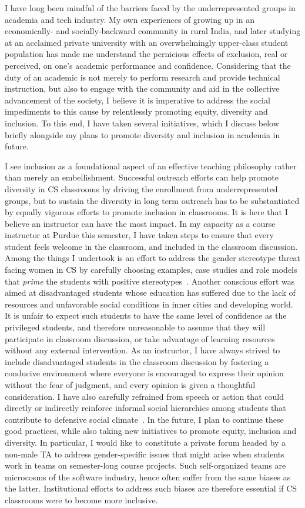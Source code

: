 I have long been mindful of the barriers faced by the underrepresented
groups in academia and tech industry. My own experiences of growing up
in an economically- and socially-backward community in rural India,
and later studying at an acclaimed private university with an
overwhelmingly upper-class student population has made me understand
the pernicious effects of exclusion, real or perceived, on one's
academic performance and confidence. Considering that the duty of an
academic is not merely to perform research and provide technical
instruction, but also to engage with the community and aid in the
collective advancement of the society, I believe it is imperative to
address the social impediments to this cause by relentlessly promoting
equity, diversity and inclusion. To this end, I have taken several
initiatives, which I discuss below briefly alongside my plans to
promote diversity and inclusion in academia in future.

I see inclusion as a foundational aspect of an effective teaching
philosophy rather than merely an embellishment. Successful outreach
efforts can help promote diversity in CS classrooms by driving the
enrollment from underrepresented groups, but to sustain the diversity
in long term outreach has to be substantiated by equally vigorous
efforts to promote inclusion in classrooms. It is here that I believe
an instructor can have the most impact. In my capacity as a course
instructor at Purdue this semester, I have taken steps to ensure that
every student feels welcome in the classroom, and included in the
classroom discussion. Among the things I undertook is an effort to
address the gender stereotype threat facing women in CS by carefully
choosing examples, case studies and role models that \emph{prime} the
students with positive stereotypes~\cite{MA07,SG11}.  Another
conscious effort was aimed at disadvantaged students whose education
has suffered due to the lack of resources and unfavorable social
conditions in inner cities and developing world. It is unfair to
expect such students to have the same level of confidence as the
privileged students, and therefore unreasonable to assume that they
will participate in classroom discussion, or take advantage of
learning resources without any external intervention. As an
instructor, I have always strived to include disadvantaged students in
the classroom discussion by fostering a conducive environment where
everyone is encouraged to express their opinion without the fear of
judgment, and every opinion is given a thoughtful consideration. I
have also carefully refrained from speech or action that could
directly or indirectly reinforce informal social hierarchies among
students that contribute to defensive social climate~\cite{BGJ02}. In
the future, I plan to continue these good practices, while also taking
new initiatives to promote equity, inclusion and diversity. In
particular, I would like to constitute a private forum headed by a
non-male TA to address gender-specific issues that might arise when
students work in teams on semester-long course projects. Such
self-organized teams are microcosms of the software industry, hence
often suffer from the same biases as the latter. Institutional efforts
to address such biases are therefore essential if CS classrooms were
to become more inclusive.

